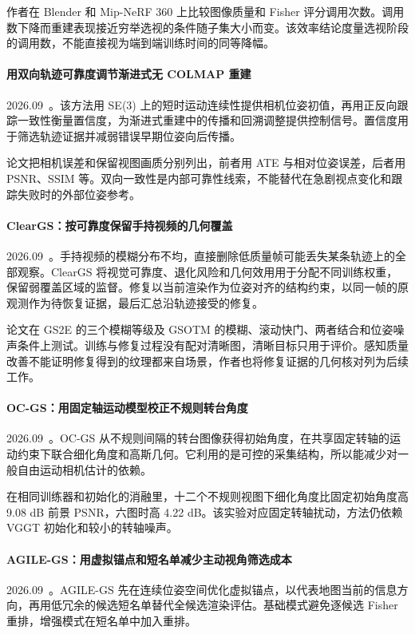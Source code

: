 作者在 Blender 和 Mip-NeRF 360 上比较图像质量和 Fisher 评分调用次数。调用数下降而重建表现接近穷举选视的条件随子集大小而变。该效率结论度量选视阶段的调用数，不能直接视为端到端训练时间的同等降幅。

\paragraph{用双向轨迹可靠度调节渐进式无 COLMAP 重建}
2026.09~\cite{2609_30865}。该方法用 SE(3) 上的短时运动连续性提供相机位姿初值，再用正反向跟踪一致性衡量置信度，为渐进式重建中的传播和回溯调整提供控制信号。置信度用于筛选轨迹证据并减弱错误早期位姿向后传播。

论文把相机误差和保留视图画质分别列出，前者用 ATE 与相对位姿误差，后者用 PSNR、SSIM 等。双向一致性是内部可靠性线索，不能替代在急剧视点变化和跟踪失败时的外部位姿参考。

\paragraph{ClearGS：按可靠度保留手持视频的几何覆盖}
2026.09~\cite{2609_31509}。手持视频的模糊分布不均，直接删除低质量帧可能丢失某条轨迹上的全部观察。ClearGS 将视觉可靠度、退化风险和几何效用用于分配不同训练权重，保留弱覆盖区域的监督。修复以当前渲染作为位姿对齐的结构约束，以同一帧的原观测作为待恢复证据，最后汇总沿轨迹接受的修复。

论文在 GS2E 的三个模糊等级及 GSOTM 的模糊、滚动快门、两者结合和位姿噪声条件上测试。训练与修复过程没有配对清晰图，清晰目标只用于评价。感知质量改善不能证明修复得到的纹理都来自场景，作者也将修复证据的几何核对列为后续工作。

\paragraph{OC-GS：用固定轴运动模型校正不规则转台角度}
2026.09~\cite{2609_31572}。OC-GS 从不规则间隔的转台图像获得初始角度，在共享固定转轴的运动约束下联合细化角度和高斯几何。它利用的是可控的采集结构，所以能减少对一般自由运动相机估计的依赖。

在相同训练器和初始化的消融里，十二个不规则视图下细化角度比固定初始角度高 9.08 dB 前景 PSNR，六图时高 4.22 dB。该实验对应固定转轴扰动，方法仍依赖 VGGT 初始化和较小的转轴噪声。

\paragraph{AGILE-GS：用虚拟锚点和短名单减少主动视角筛选成本}
2026.09~\cite{2609_34176}。AGILE-GS 先在连续位姿空间优化虚拟锚点，以代表地图当前的信息方向，再用低冗余的候选短名单替代全候选渲染评估。基础模式避免逐候选 Fisher 重排，增强模式在短名单中加入重排。

